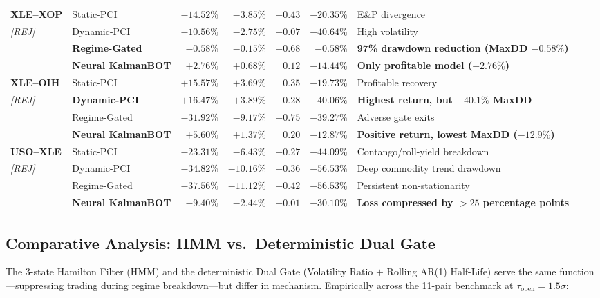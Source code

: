 \documentclass[11pt, a4paper]{article}
\begin{document}
\begin{center}
\begin{longtable}{llrrrrp{4.8cm}}
\midrule
\textbf{XLE--XOP} & Static-PCI & $-14.52\%$ & $-3.85\%$ & $-0.43$ & $-20.35\%$ & E\&P divergence \\
\small\textit{[REJ]} & Dynamic-PCI & $-10.56\%$ & $-2.75\%$ & $-0.07$ & $-40.64\%$ & High volatility \\
 & \textbf{Regime-Gated} & $\mathbf{-0.58\%}$ & $\mathbf{-0.15\%}$ & $\mathbf{-0.68}$ & $\mathbf{-0.58\%}$ & \textbf{97\% drawdown reduction (MaxDD $-0.58\%$)} \\
 & \textbf{Neural KalmanBOT} & $\mathbf{+2.76\%}$ & $\mathbf{+0.68\%}$ & $\mathbf{0.12}$ & $\mathbf{-14.44\%}$ & \textbf{Only profitable model ($+2.76\%$)} \\
\midrule
\textbf{XLE--OIH} & Static-PCI & $+15.57\%$ & $+3.69\%$ & $0.35$ & $-19.73\%$ & Profitable recovery \\
\small\textit{[REJ]} & \textbf{Dynamic-PCI} & $\mathbf{+16.47\%}$ & $\mathbf{+3.89\%}$ & $\mathbf{0.28}$ & $\mathbf{-40.06\%}$ & \textbf{Highest return, but $-40.1\%$ MaxDD} \\
 & Regime-Gated & $-31.92\%$ & $-9.17\%$ & $-0.75$ & $-39.27\%$ & Adverse gate exits \\
 & \textbf{Neural KalmanBOT} & $\mathbf{+5.60\%}$ & $\mathbf{+1.37\%}$ & $\mathbf{0.20}$ & $\mathbf{-12.87\%}$ & \textbf{Positive return, lowest MaxDD ($-12.9\%$)} \\
\midrule
\textbf{USO--XLE} & Static-PCI & $-23.31\%$ & $-6.43\%$ & $-0.27$ & $-44.09\%$ & Contango/roll-yield breakdown \\
\small\textit{[REJ]} & Dynamic-PCI & $-34.82\%$ & $-10.16\%$ & $-0.36$ & $-56.53\%$ & Deep commodity trend drawdown \\
 & Regime-Gated & $-37.56\%$ & $-11.12\%$ & $-0.42$ & $-56.53\%$ & Persistent non-stationarity \\
 & \textbf{Neural KalmanBOT} & $\mathbf{-9.40\%}$ & $\mathbf{-2.44\%}$ & $\mathbf{-0.01}$ & $\mathbf{-30.10\%}$ & \textbf{Loss compressed by $>25$ percentage points} \\
\end{longtable}
\end{center}

\subsection{Comparative Analysis: HMM vs.\ Deterministic Dual Gate}
The 3-state Hamilton Filter (HMM) and the deterministic Dual Gate (Volatility Ratio $+$ Rolling AR(1) Half-Life) serve the same function---suppressing trading during regime breakdown---but differ in mechanism. Empirically across the 11-pair benchmark at $\tau_{\text{open}} = 1.5\sigma$:
\end{document}
